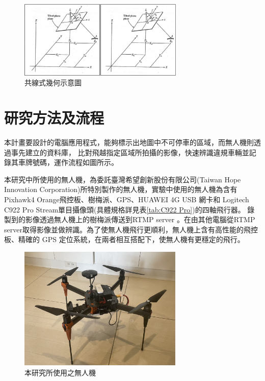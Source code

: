 \documentclass[12pt]{article}       %
\renewcommand{\figurename}{圖}                           %
\begin{document}
\begin{figure}[H]
    \centering
    \renewcommand{\figurename}{圖}                              %
    \includegraphics[width=0.7\textwidth]{ce.jpg}         %
    \caption{共線式幾何示意圖\cite{tsao2018}}           %
    \label{fig:ce}                                        %
\end{figure}

\section{\centering 研究方法及流程}
\hspace{2em}本計畫要設計的電腦應用程式，能夠標示出地圖中不可停車的區域，而無人機則透過事先建立的資料庫，
比對飛越指定區域所拍攝的影像，快速辨識違規車輛並記錄其車牌號碼，運作流程如圖所示。

本研究中所使用的無人機，為委託臺灣希望創新股份有限公司(Taiwan Hope Innovation Corporation)所特別製作的無人機，實驗中使用的無人機為含有 Pixhawk4 Orange飛控板、樹梅派、GPS、HUAWEI 4G USB 網卡和 Logitech C922 Pro Stream單目攝像頭(具體規格詳見表\ref{tab:C922 Pro})的四軸飛行器。
錄製到的影像透過無人機上的樹梅派傳送到RTMP server \cite{chen2011}\cite{mark2018}。在由其他電腦從RTMP server取得影像並做辨識。為了使無人機飛行更順利，無人機上含有高性能的飛控板、精確的 GPS 定位系統，在兩者相互搭配下，使無人機有更穩定的飛行。

\begin{figure}[H]
    \centering
    \includegraphics[width=0.7\textwidth]{UAVphoto.jpg}     %
    \caption{本研究所使用之無人機}    %
    \label{fig:UAVphoto}    %
\end{figure}
\end{document}
